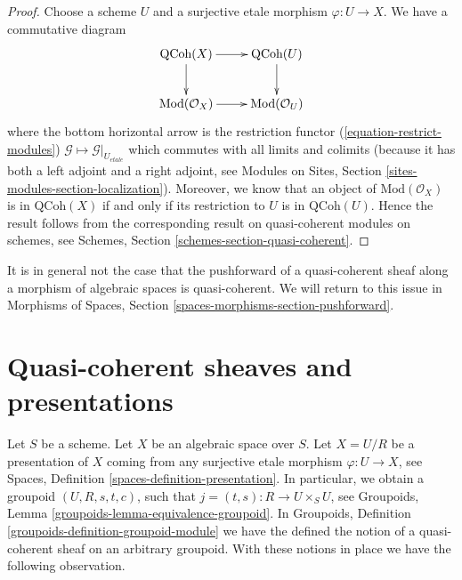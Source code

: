 \begin{proof}
Choose a scheme $U$ and a surjective etale morphism $\varphi : U \to X$.
We have a commutative diagram
$$
\xymatrix{
\text{QCoh}(X) \ar[r] \ar[d] & \text{QCoh}(U) \ar[d] \\
\text{Mod}(\mathcal{O}_X) \ar[r] & \text{Mod}(\mathcal{O}_U)
}
$$
where the bottom horizontal arrow is the restriction functor
(\ref{equation-restrict-modules})
$\mathcal{G} \mapsto \mathcal{G}|_{U_{etale}}$ which commutes
with all limits and colimits (because it has both a left adjoint and
a right adjoint, see
Modules on Sites, Section \ref{sites-modules-section-localization}).
Moreover, we know that an object of $\text{Mod}(\mathcal{O}_X)$ is in
$\text{QCoh}(X)$ if and only if its restriction to $U$ is in
$\text{QCoh}(U)$. Hence the result follows from the corresponding
result on quasi-coherent modules on schemes, see
Schemes, Section \ref{schemes-section-quasi-coherent}.
\end{proof}

\noindent
It is in general not the case that the pushforward of a quasi-coherent sheaf
along a morphism of algebraic spaces is quasi-coherent. We will return to this
issue in
Morphisms of Spaces, Section \ref{spaces-morphisms-section-pushforward}.







\section{Quasi-coherent sheaves and presentations}
\label{section-quasi-coherent-presentation}

\noindent
Let $S$ be a scheme. Let $X$ be an algebraic space over $S$.
Let $X = U/R$ be a presentation of $X$ coming from any surjective
etale morphism $\varphi : U \to X$, see
Spaces, Definition \ref{spaces-definition-presentation}.
In particular, we obtain a groupoid $(U, R, s, t, c)$, such that
$j = (t, s) : R \to U \times_S U$, see
Groupoids, Lemma \ref{groupoids-lemma-equivalence-groupoid}.
In
Groupoids, Definition \ref{groupoids-definition-groupoid-module}
we have the defined the notion of a quasi-coherent sheaf
on an arbitrary groupoid. With these notions in place we have
the following observation.

